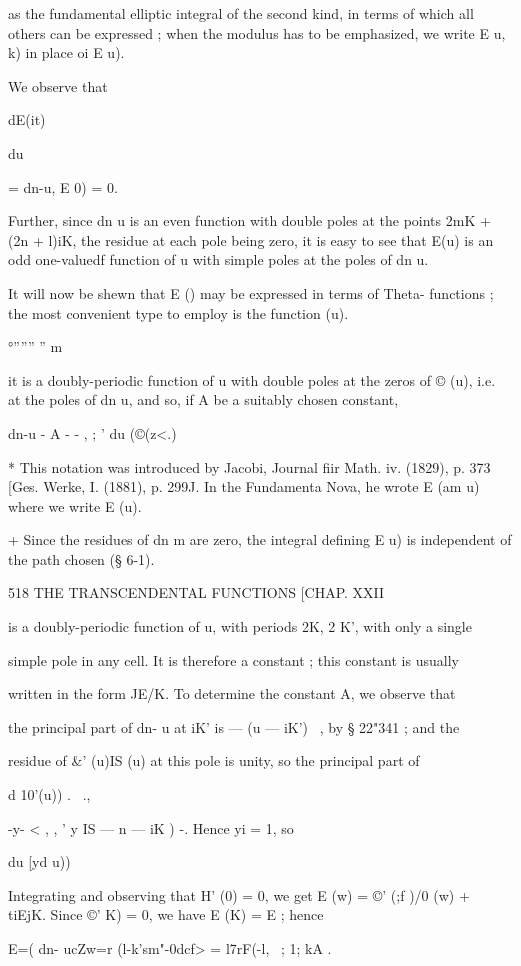 as the fundamental elliptic integral of the second kind, in terms of
which all others can be expressed ; when the modulus has to be
emphasized, we write E u, k) in place oi E u).

We observe that

dE(it)

du

= dn-u, E 0) = 0.

Further, since dn u is an even function with double poles at the
points 2mK + (2n + l)iK, the residue at each pole being zero, it is
easy to see that E(u) is an odd one-valuedf function of u with simple
poles at the poles of dn u.

It will now be shewn that E () may be expressed in terms of Theta-
functions ; the most convenient type to employ is the function (u).

 °'''''' '' m %

it is a doubly-periodic function of u with double poles at the zeros
of © (u), i.e. at the poles of dn u, and so, if A be a suitably chosen
constant,

dn-u - A - - , ; ' du (©(z<.)

* This notation was introduced by Jacobi, Journal fiir Math. iv.
(1829), p. 373 [Ges. Werke, I. (1881), p. 299J. In the Fundamenta
Nova, he wrote E (am u) where we write E (u).

+ Since the residues of dn m are zero, the integral defining E u) is
independent of the path chosen (§ 6-1).

518 THE TRANSCENDENTAL FUNCTIONS [CHAP. XXII

is a doubly-periodic function of u, with periods 2K, 2 K', with only a
single

simple pole in any cell. It is therefore a constant ; this constant is
usually

written in the form JE/K. To determine the constant A, we observe that

the principal part of dn- u at iK' is — (u — iK')~ , by § 22"341 ; and
the

residue of \&' (u)IS (u) at this pole is unity, so the principal part
of

d 10'(u)) . \ .,

-y- < , , ' y IS — n — iK ) -. Hence yi = 1, so

du [yd u))

Integrating and observing that H' (0) = 0, we get E (w) = ©' (;f )/0
(w) + tiEjK. Since ©' K) = 0, we have E (K) = E ; hence

E=( dn- ucZw=r (l-k'sm"-0dcf> = l7rF(-l, ~; 1; kA .

